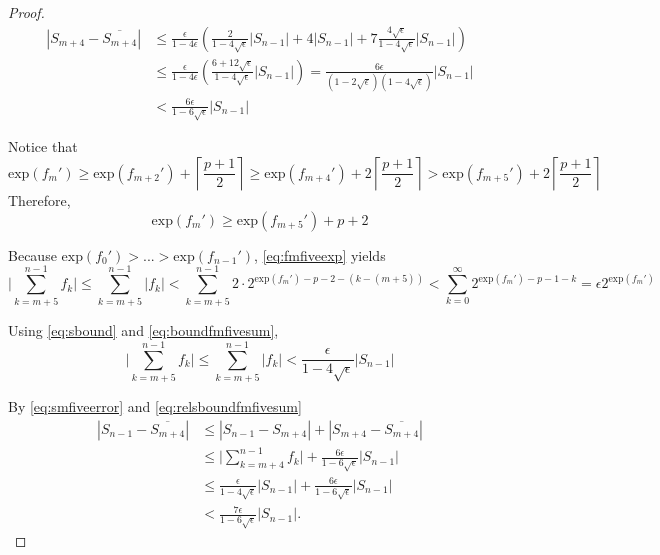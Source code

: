 \documentclass[12pt]{article}
\providecommand{\exp}{\ensuremath{\text{exp}}}
\theoremstyle{definition}
\numberwithin{equation}{section}
\numberwithin{figure}{section}
\begin{document}
\begin{proof}
      \begin{align}
      \left|S_{m+4} - \overline{S_{m+4}}\right|
          & \leq \frac{\epsilon}{1-4\epsilon}
              \left(
                  \frac{2}{1-4\sqrt{\epsilon}} |S_{n-1}|
                  + 4 |S_{n-1}|
                  + 7 \frac{4\sqrt{\epsilon}}{1-4\sqrt{\epsilon}} |S_{n-1}|
              \right) \nonumber \\
          & \leq \frac{\epsilon}{1-4\epsilon} \left(\frac{6+12\sqrt{\epsilon}}{1-4\sqrt{\epsilon}} |S_{n-1}|\right)
              = \frac{6\epsilon }{(1-2\sqrt{\epsilon})(1-4\sqrt{\epsilon})} |S_{n-1}| \nonumber \\
          & < \frac{6\epsilon}{1-6\sqrt{\epsilon}} |S_{n-1}|
          \label{eq:smfiveerror}
      \end{align}

      Notice that
      \begin{equation*}
        \exp(f_m') \geq \exp(f_{m + 2}') + \left\lceil\frac{p+ 1}{2}\right\rceil \geq \exp(f_{m + 4}') + 2  \left\lceil\frac{p + 1}{2}\right\rceil > \exp(f_{m + 5}')+ 2  \left\lceil\frac{p+ 1}{2}\right\rceil
      \end{equation*}
      Therefore,
      \begin{equation}
        \exp(f_m') \geq \exp(f_{m + 5}') + p + 2
        \label{eq:fmfiveexp}
      \end{equation}

      Because $\exp(f_0') > ... > \exp(f_{n - 1}')$, \eqref{eq:fmfiveexp} yields
      \begin{equation}
        \bigl|\sum\limits_{k = m + 5}^{n - 1} f_k\bigr| \leq \sum\limits_{k = m + 5}^{n - 1} |f_k| < \sum\limits_{k = m + 5}^{n - 1} 2 \cdot 2^{\exp(f_m') - p - 2 - (k - (m + 5))} < \sum\limits_{k = 0}^{\infty} 2^{\exp(f_m') - p - 1 - k} = \epsilon 2^{\exp(f_m')}
        \label{eq:boundfmfivesum}
      \end{equation}

      Using \eqref{eq:sbound} and \eqref{eq:boundfmfivesum},
      \begin{equation}
        \bigl|\sum\limits_{k = m + 5}^{n - 1} f_k\bigr| \leq \sum\limits_{k = m + 5}^{n - 1} |f_k| < \frac{\epsilon}{1 - 4  \sqrt\epsilon}|S_{n - 1}|
        \label{eq:relsboundfmfivesum}
      \end{equation}

      By \eqref{eq:smfiveerror} and \eqref{eq:relsboundfmfivesum}
      \begin{align}
        \left|S_{n-1} - \overline{S_{m+4}}\right|
        & \leq |S_{n-1} - S_{m+4}| + \left|S_{m+4} - \overline{S_{m+4}}\right| \nonumber \\
        & \leq \bigl|\sum_{k=m+4}^{n-1} f_k\bigr| + \frac{6\epsilon}{1-6\sqrt{\epsilon}} |S_{n-1}| \nonumber \\
        & \leq \frac{\epsilon}{1 - 4 \sqrt\epsilon}|S_{n-1}| + \frac{6\epsilon}{1-6\sqrt{\epsilon}} |S_{n-1}| \nonumber \\
        & <  \frac{7\epsilon}{1-6\sqrt{\epsilon}} |S_{n-1}|.
        \label{eq:smfiveerror-1}
      \end{align}


\end{proof}
\end{document}

